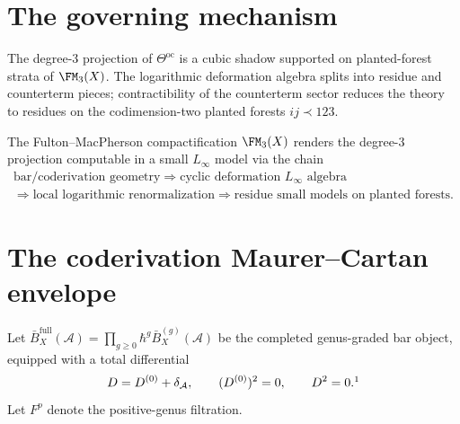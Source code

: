 \label{chap:fm3-planted-forest-synthesis}

\providecommand{\MC}{\mathrm{MC}}
\providecommand{\Defcyc}{\operatorname{Def}_{\mathrm{cyc}}}
\providecommand{\Cone}{\operatorname{Cone}}
\providecommand{\Tot}{\operatorname{Tot}}
\providecommand{\adop}{\operatorname{ad}}
\providecommand{\cA}{\mathcal A}
\providecommand{\cB}{\mathcal B}
\providecommand{\cC}{\mathcal C}
\providecommand{\cD}{\mathcal D}
\providecommand{\cF}{\mathcal F}
\providecommand{\cL}{\mathcal L}
\providecommand{\cR}{\mathcal R}
\providecommand{\Q}{\mathbf Q}
\providecommand{\C}{\mathbf C}
\providecommand{\Pone}{\mathbf P^1}
\providecommand{\Aone}{\mathbf A^1}

\section{The governing mechanism}

The degree-3 projection of $\Theta^{\mathrm{oc}}$ is a cubic shadow supported on planted-forest strata of $\FM_3(X)$. The logarithmic deformation algebra splits into residue and counterterm pieces; contractibility of the counterterm sector reduces the theory to residues on the codimension-two planted forests $ij\prec 123$.

The Fulton--MacPherson compactification $\FM_3(X)$ renders the degree-3 projection computable in a small $L_\infty$ model via the chain
\begin{equation}
\label{eq:grand-chain}
\begin{gathered}
\text{bar/coderivation geometry}
\Longrightarrow
\text{cyclic deformation }L_\infty\text{ algebra}\\
\Longrightarrow
\text{local logarithmic renormalization}
\Longrightarrow
\text{residue small models on planted forests}.
\end{gathered}
\end{equation}

\section{The coderivation Maurer--Cartan envelope}

Let $\bar B_X^{\mathrm{full}}(\cA)=\prod_{g\ge 0}\hbar^g\bar B_X^{(g)}(\cA)$ be the
completed genus-graded bar object, equipped with a total differential
\[
D = D^{(0)} + \delta_{\cA},
\qquad
(D^{(0)})^2=0,
\qquad
D^2=0.\footnotemark
\]
%
Let $F^p$ denote the positive-genus filtration.

